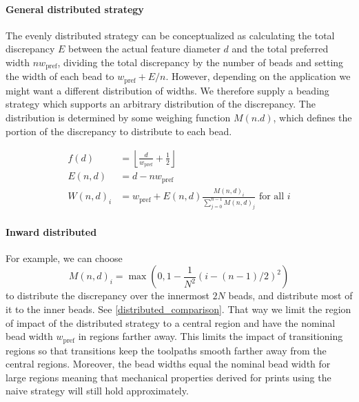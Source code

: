 \paragraph{General distributed strategy}
The evenly distributed strategy can be conceptualized as calculating the total discrepancy $E$ between the actual feature diameter $d$ and the total preferred width $n w_\text{pref}$, dividing the total discrepancy by the number of beads and setting the width of each bead to 
$w_\text{pref} + E / n$.
However, depending on the application we might want a different distribution of widths.
We therefore supply a beading strategy which supports an arbitrary distribution of the discrepancy.
The distribution is determined by some weighing function $M(n.d)$, which defines the portion of the discrepancy to distribute to each bead.


\begin{align*}
f(d) &= \left\lfloor \frac{d}{ w_\text{pref}} + \frac12 \right\rfloor \\
E(n,d) &= d - n w_\text{pref} \\
W(n,d)_i &= w_\text{pref} + E(n,d) \frac{M(n,d)_i}{\sum_{j=0}^{n-1} M(n,d)_j} \text{ for all } i 
\end{align*}


\paragraph{Inward distributed}
For example, we can choose 
$$M(n,d)_i = \max(0, 1 - \frac{1}{N^2} (i - (n-1)/2)^2 )$$
to distribute the discrepancy over the innermost $2N$ beads, and distribute most of it to the inner beads.
See \cref{distributed_comparison}.
That way we limit the region of impact of the distributed strategy to a central region and have the nominal bead width $w_\text{pref}$ in regions farther away.
This limits the impact of transitioning regions so that transitions keep the toolpaths smooth farther away from the central regions. %
Moreover, the bead widths equal the nominal bead width for large regions meaning that mechanical properties derived for prints using the naive strategy will still hold approximately.




